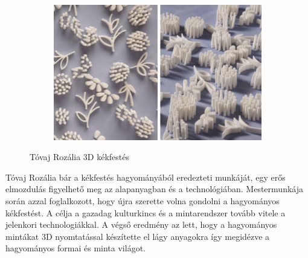 \begin{figure}[ht!]
	\begin{subfigure}[b]{0.3\linewidth}
		\includegraphics[width=\linewidth]{img/tr_03.png}
		\caption{}
	  \end{subfigure}
	\caption{Tóvaj Rozália 3D kékfestés}
	\label{fig:tr}
  \end{figure}

  Tóvaj Rozália bár a kékfestés hagyományából eredezteti munkáját, egy erős elmozdulás figyelhető meg az alapanyagban és a technológiában. Mestermunkája \cite{tovaj2018} során azzal foglalkozott, hogy újra szerette volna gondolni a hagyományos kékfestést. A célja a gazadag kulturkincs és a mintarendszer tovább vitele a jelenkori technologiákkal. A végső eredmény az lett, hogy a hagyományos mintákat 3D nyomtatással készítette el lágy anyagokra így megidézve a hagyományos formai és minta világot.
